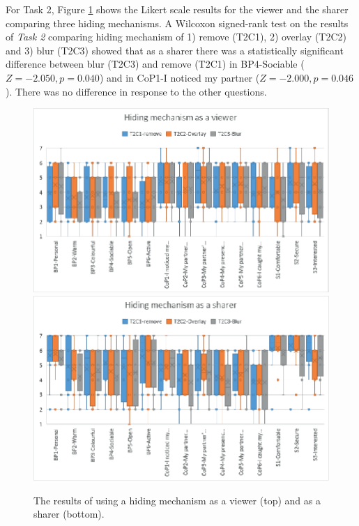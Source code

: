 For Task 2, Figure \ref{fig:frontier18:result-hiding} shows the Likert scale results for the viewer and the sharer comparing three hiding mechanisms. A Wilcoxon signed-rank test on the results of \textit{Task 2} comparing hiding mechanism of 1) remove (T2C1), 2) overlay (T2C2) and 3) blur (T2C3) showed that as a sharer there was a statistically significant difference between blur (T2C3) and remove (T2C1) in BP4-Sociable ($Z=-2.050, p=0.040$) and in CoP1-I noticed my partner ($Z=-2.000, p=0.046$). There was no difference in response to the other questions.


\begin{figure}[H]
    \begin{center}
    \includegraphics[width=0.9\linewidth]{images/frontier18/images-05.eps}
    \includegraphics[width=0.9\linewidth]{images/frontier18/images-06.eps}
    \caption{The results of using a hiding mechanism as a viewer (top) and as a sharer (bottom).}\label{fig:frontier18:result-hiding}
    \end{center}
\end{figure}

